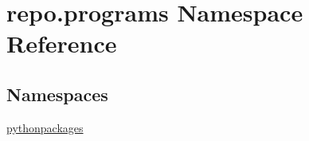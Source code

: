 \hypertarget{namespacerepo_1_1programs}{\section{repo.\-programs Namespace Reference}
\label{namespacerepo_1_1programs}
}
\subsection*{Namespaces}
\begin{DoxyCompactItemize}
\item 
\hyperlink{namespacerepo_1_1programs_1_1pythonpackages}{pythonpackages}
\end{DoxyCompactItemize}
